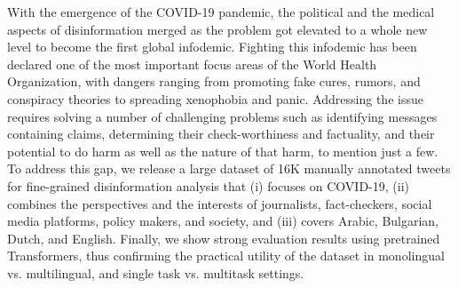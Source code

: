 With the emergence of the COVID-19 pandemic, the political and the medical aspects of disinformation merged as the problem got elevated to a whole new level to become the first global infodemic. Fighting this infodemic has been declared one of the most important focus areas of the World Health Organization, with dangers ranging from promoting fake cures, rumors, and conspiracy theories to spreading xenophobia and panic. Addressing the issue requires solving a number of challenging problems such as identifying messages containing claims, determining their check-worthiness and factuality, and their potential to do harm as well as the nature of that harm, to mention just a few. To address this gap, we release a large dataset of 16K manually annotated tweets for fine-grained disinformation analysis that (i) focuses on COVID-19, (ii) combines the perspectives and the interests of journalists, fact-checkers, social media platforms, policy makers, and society, and (iii) covers Arabic, Bulgarian, Dutch, and English. Finally, we show strong evaluation results using pretrained Transformers, thus confirming the practical utility of the dataset in monolingual vs. multilingual, and single task vs. multitask settings.
